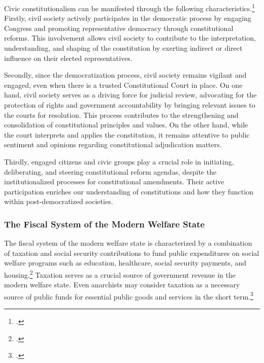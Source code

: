 \documentclass[]{article}
\begin{document}

Civic constitutionalism can be manifested through the following characteristics.\footcite[at 320]{Yeh2015} Firstly, civil society actively participates in the democratic process by engaging Congress and promoting representative democracy through constitutional reforms. This involvement allows civil society to contribute to the interpretation, understanding, and shaping of the constitution by exerting indirect or direct influence on their elected representatives.

Secondly, since the democratization process, civil society remains vigilant and engaged, even when there is a trusted Constitutional Court in place. On one hand, civil society serves as a driving force for judicial review, advocating for the protection of rights and government accountability by bringing relevant issues to the courts for resolution. This process contributes to the strengthening and consolidation of constitutional principles and values. On the other hand, while the court interprets and applies the constitution, it remains attentive to public sentiment and opinions regarding constitutional adjudication matters.

Thirdly, engaged citizens and civic groups play a crucial role in initiating, deliberating, and steering constitutional reform agendas, despite the institutionalized processes for constitutional amendments. Their active participation enriches our understanding of constitutions and how they function within post-democratized societies.



\subsubsection{The Fiscal System of the Modern Welfare State}

The fiscal system of the modern welfare state is characterized by a combination of taxation and social security contributions to fund public expenditures on social welfare programs such as education, healthcare, social security payments, and housing.\footcite{2023a}
Taxation serves as a crucial source of government revenue in the modern welfare state.
Even anarchists may consider taxation as a necessary source of public funds for essential public goods and services in the short term.\footcite[30]{chomsky2013anarchism}
\end{document}
